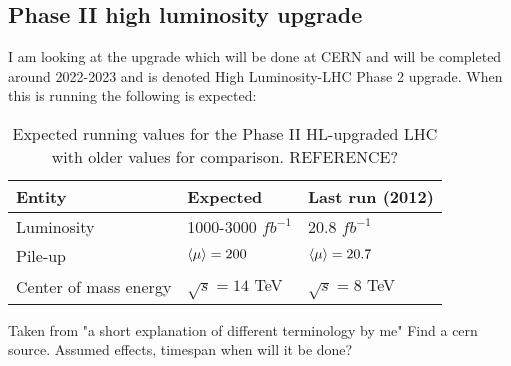 \subsection{Phase II high luminosity upgrade}
I am looking at the upgrade which will be done at CERN and will be completed around 2022-2023 and is denoted High Luminosity-LHC Phase 2 upgrade. When this is running the following is expected:
\begin{table}[H]
\begin{center}
    \begin{tabular}{ | l | l | l |}
    \hline
    Entity & Expected & Last run (2012) \\ \hline
  	Luminosity & 1000-3000 $fb^{-1}$ & 20.8 $fb^{-1}$ \\ \hline
  	Pile-up & $\left<\mu\right>=200$ & $\left<\mu\right>=20.7$ \\ \hline
  	Center of mass energy & $\sqrt{s}=14$ TeV &  $\sqrt{s}=8$ TeV \\ \hline
  	\end{tabular}
  	
  	\caption{Expected running values for the Phase II HL-upgraded LHC with older values for comparison. REFERENCE?}
  	\label{tab:expectvalues}
  	\end{center}
    \end{table}
Taken from "a short explanation of different terminology by me" Find a cern source.
Assumed effects, timespan when will it be done?
